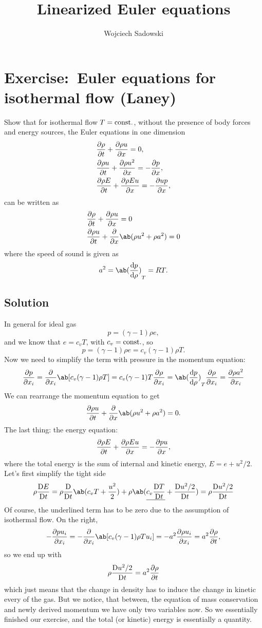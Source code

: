 \documentclass[justified, nobib,a4paper]{tufte-handout}
\title{Linearized Euler equations}
\author[Wojciech Sadowski]{Wojciech Sadowski}
\newcommand{\Q}[1]{\section{Exercise:~{#1}}}
\newcommand{\Sol}{\subsection{Solution}}
\begin{document}
\maketitle%

\tableofcontents


\Q{Euler equations for isothermal flow (Laney)}
Show that for isothermal flow \(T=\mathrm{const.}\), without the presence of body forces and energy sources, the Euler equations in one dimension
\[
	\begin{split}
		 & \pdv{\rho}{t} + \pdv{\rho u}{x} = 0, \\
		 & \pdv{\rho u}{t} + \pdv{\rho u^2}{x}
		= -\pdv{p}{x},                          \\
		 & \pdv{\rho E}{t} + \pdv{\rho E u}{x}
		=  -\pdv{u p}{x},
	\end{split}
\]
can be written as
\[
	\begin{split}
		 & \pdv{\rho}{t} + \pdv{\rho u}{x} = 0                     \\
		 & \pdv{\rho u}{t} + \pdv{}{x}\ab(\rho u^2 + \rho a^2) = 0
	\end{split}
\]
where the speed of sound is given as
\[
	a^2 = {\ab(\odv{p}{\rho})}_T = RT.
\]

\Sol{}
In general for ideal gas
\[
	p = (\gamma - 1) \rho e,
\]
and we know that \(e = c_v T\), with \(c_v=\mathrm{const.}\), so
\[
	p = (\gamma - 1) \rho e = c_v(\gamma - 1)\rho T.
\]
Now we need to simplify the term with pressure in the momentum equation:
\[
	\pdv{p}{x_i} = \pdv{}{x_i}\ab[ c_v(\gamma - 1)\rho T] =
	c_v(\gamma - 1)T\pdv{\rho}{x_i} = {\ab(\odv{p}{\rho})}_T\pdv{\rho}{x_i}
	= \pdv{\rho a^2}{x_i}
\]
We can rearrange the momentum equation to get
\[
	\pdv{\rho u}{t} + \pdv{}{x}\ab(\rho u^2 + \rho a^2) = 0.
\]
The last thing: the energy equation:
\[
	\pdv{\rho E}{t} + \pdv{\rho E u}{x}  =  -\pdv{p u}{x},
\]
where the total energy is the sum of internal and kinetic energy, $E = e + u^2/2$.
Let's first simplify the tight side
\[
	\rho \mdv{E}{t} = \rho \mdv{}{t}\ab(c_v T + \frac{u^2}{2}) +
	\rho \ab( \underline{c_v \mdv{T}{t}} + \mdv{u^2 /2}{t} ) =
	\rho\mdv{u^2/2}{t}
\]
Of course, the underlined term has to be zero due to the assumption of
isothermal flow.
On the right,
\[
	-\pdv{p u_i}{x_i} = -\pdv{}{x_i}\ab[ c_v(\gamma - 1)\rho T u_i] =
	-a^2\pdv{\rho u_i}{x_i} = a^2\pdv{\rho}{t},
\]
so we end up with
\[
	\rho\mdv{u^2/2}{t} = a^2\pdv{\rho}{t}
\]
which just means that the change in density has to induce the change in kinetic
every of the gas. But we notice, that between, the equation of mass
conservation and newly derived momentum we have only two variables now. So we
essentially finished our exercise, and the total (or kinetic) energy is
essentially a  quantity.
\end{document}

